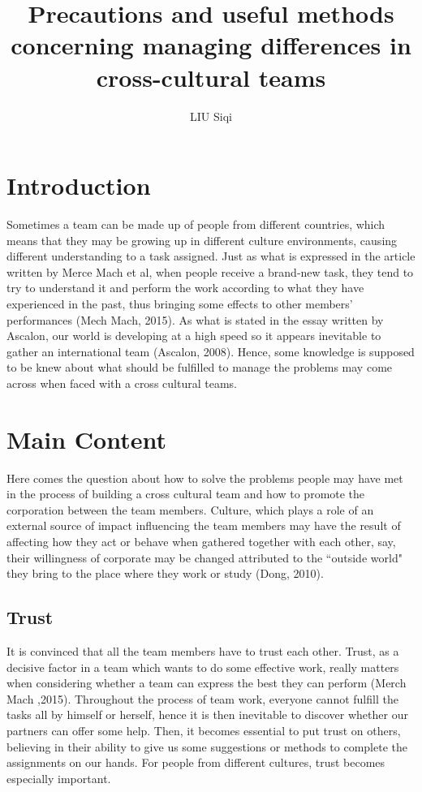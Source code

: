 \documentclass{article}
\title{\textbf {Precautions and useful methods concerning managing differences in  cross-cultural teams}}
\date{}
\author{LIU Siqi}
\begin{document}
\maketitle

\section{Introduction}

Sometimes a team can be made up of people from different countries, which means that they may be growing up in different culture environments, causing different understanding to a task assigned. Just as what is expressed in the article written by Merce Mach et al, when people receive a brand-new task, they tend to try to understand it and perform the work according to what they have experienced in the past, thus bringing some effects to other members' performances (Mech Mach, 2015). \cite{mach2015team} As what is stated in the essay written by Ascalon, our world is developing at a high speed so it appears inevitable to gather an international team (Ascalon, 2008). \cite{evelina2008cross} Hence, some knowledge is supposed to be knew about what should be fulfilled to manage the problems may come across when faced with a cross cultural teams.

\section{Main Content}

Here comes the question about how to solve the problems people may have met in the process of building a cross cultural team and how to promote the corporation between the team members. Culture, which plays a role of an external source of impact influencing the team members may have the result of affecting how they act or behave when gathered together with each other, say, their willingness of corporate may be changed attributed to the ``outside world" they bring to the place where they work or study (Dong, 2010).\cite{dong2010cross}

\subsection{Trust}

It is convinced that all the team members have to trust each other. Trust, as a decisive factor in a team which wants to do some effective work, really matters when considering whether a team can express the best they can perform (Merch Mach ,2015). \cite{mach2015team} Throughout the process of team work, everyone cannot fulfill the tasks all by himself or herself, hence it is then inevitable to discover whether our partners can offer some help. Then, it becomes essential to put trust on others, believing in their ability to give us some suggestions or methods to complete the assignments on our hands. For people from different cultures, trust becomes especially important.
\end{document}
